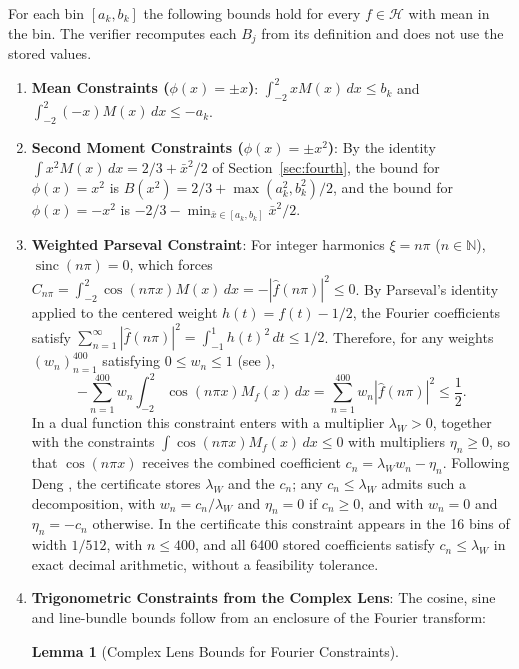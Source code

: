 \documentclass[11pt,a4paper]{article}
\newtheorem{lemma}[theorem]{Lemma}
\theoremstyle{definition}
\theoremstyle{remark}
\newcommand{\N}{\mathbb{N}}
\begin{document}
For each bin $[a_k, b_k]$ the following bounds hold for every $f \in \mathcal{H}$ with mean in the bin. The verifier recomputes each $B_j$ from its definition and does not use the stored values.
\begin{enumerate}
\item \textbf{Mean Constraints ($\phi(x) = \pm x$)}:
  $\int_{-2}^2 x M(x) \, dx \le b_k$ and $\int_{-2}^2 (-x) M(x) \, dx \le -a_k$.
\item \textbf{Second Moment Constraints ($\phi(x) = \pm x^2$)}:
  By the identity $\int x^2 M(x) \, dx = 2/3 + \bar{x}^2/2$ of Section~\ref{sec:fourth}, the bound for $\phi(x) = x^2$ is $B(x^2) = 2/3 + \max(a_k^2, b_k^2)/2$, and the bound for $\phi(x) = -x^2$ is $-2/3 - \min_{\bar{x} \in [a_k, b_k]} \bar{x}^2/2$.
\item \textbf{Weighted Parseval Constraint}:
  For integer harmonics $\xi = n\pi$ ($n \in \N$), $\operatorname{sinc}(n\pi) = 0$, which forces $C_{n\pi} = \int_{-2}^2 \cos(n\pi x) M(x) \, dx = -|\widehat{f}(n\pi)|^2 \le 0$. By Parseval's identity applied to the centered weight $h(t) = f(t) - 1/2$, the Fourier coefficients satisfy $\sum_{n=1}^\infty |\widehat{f}(n\pi)|^2 = \int_{-1}^1 h(t)^2 \, dt \le 1/2$. Therefore, for any weights $(w_n)_{n=1}^{400}$ satisfying $0 \le w_n \le 1$ (see \cite{white2022, deng2026}),
  \begin{equation}
  -\sum_{n=1}^{400} w_n \int_{-2}^2 \cos(n\pi x) M_f(x) \, dx = \sum_{n=1}^{400} w_n |\widehat{f}(n\pi)|^2 \le \frac{1}{2}.
  \end{equation}
  In a dual function this constraint enters with a multiplier $\lambda_W > 0$, together with the constraints $\int \cos(n\pi x) M_f(x) \, dx \le 0$ with multipliers $\eta_n \ge 0$, so that $\cos(n\pi x)$ receives the combined coefficient $c_n = \lambda_W w_n - \eta_n$. Following Deng \cite{deng2026}, the certificate stores $\lambda_W$ and the $c_n$; any $c_n \le \lambda_W$ admits such a decomposition, with $w_n = c_n/\lambda_W$ and $\eta_n = 0$ if $c_n \ge 0$, and with $w_n = 0$ and $\eta_n = -c_n$ otherwise. In the certificate this constraint appears in the 16 bins of width $1/512$, with $n \le 400$, and all 6400 stored coefficients satisfy $c_n \le \lambda_W$ in exact decimal arithmetic, without a feasibility tolerance.
\item \textbf{Trigonometric Constraints from the Complex Lens}:
  The cosine, sine and line-bundle bounds follow from an enclosure of the Fourier transform:
  \begin{lemma}[Complex Lens Bounds for Fourier Constraints]

\end{lemma}
\end{enumerate}
\end{document}
